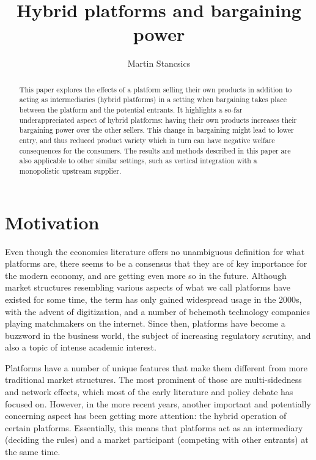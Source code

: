 \documentclass[a4paper]{article}
\title{Hybrid platforms and bargaining power}
\author{Martin Stancsics}
\begin{document}
\maketitle

\begin{abstract}
    This paper explores the effects of a platform selling their own products in addition to acting as intermediaries (hybrid platforms) in a setting when bargaining takes place between the platform and the potential entrants.
    It highlights a so-far underappreciated aspect of hybrid platforms: having their own products increases their bargaining power over the other sellers.
    This change in bargaining might lead to lower entry, and thus reduced product variety which in turn can have negative welfare consequences for the consumers.
    The results and methods described in this paper are also applicable to other similar settings, such as vertical integration with a monopolistic upstream supplier.
\end{abstract}


\section{Motivation}

Even though the economics literature offers no unambiguous definition for what platforms are, there seems to be a consensus that they are of key importance for the modern economy, and are getting even more so in the future.
Although market structures resembling various aspects of what we call platforms have existed for some time, the term has only gained widespread usage in the 2000s, with the advent of digitization, and a number of behemoth technology companies playing matchmakers on the internet.
Since then, platforms have become a buzzword in the business world, the subject of increasing regulatory scrutiny, and also a topic of intense academic interest.

Platforms have a number of unique features that make them different from more traditional market structures.
The most prominent of those are multi-sidedness and network effects, which most of the early literature \parencite[for an overview, see][]{rochet2006two} and policy debate \parencite[e.g.][]{fletcher2021consumer,calvano2021market} has focused on.
However, in the more recent years, another important and potentially concerning aspect has been getting more attention: the hybrid operation of certain platforms.
Essentially, this means that platforms act as an intermediary (deciding the rules) and a market participant (competing with other entrants) at the same time.
\end{document}
